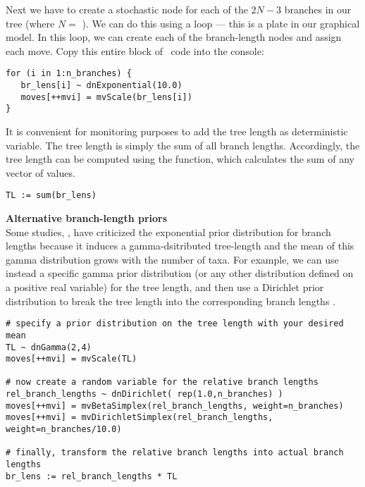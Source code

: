 Next we have to create a stochastic node for each of the $2N-3$ branches in our tree (where $N=$ ). 
We can do this using a  loop --- this is a plate in our graphical model. In this loop, we can create each of the branch-length nodes and assign each move. 
Copy this entire block of \Rev~code into the console:
{\tt \small \begin{snugshade*}
\begin{lstlisting}
for (i in 1:n_branches) {
   br_lens[i] ~ dnExponential(10.0)
   moves[++mvi] = mvScale(br_lens[i]) 
}
\end{lstlisting}
\end{snugshade*}}

It is convenient for monitoring purposes to add the tree length as deterministic variable. 
The tree length is simply the sum of all branch lengths. 
Accordingly, the tree length can be computed using the  function, which calculates the sum of any vector of values.
{\tt \begin{snugshade*}
\begin{lstlisting}
TL := sum(br_lens)
\end{lstlisting}
\end{snugshade*}}

\begin{framed}
\textbf{Alternative branch-length priors}\\
Some studies, \EG \cite{Brown2010,Rannala2012}, have criticized the exponential prior distribution for branch lengths because it induces a gamma-dsitributed tree-length and the mean of this gamma distribution grows with the number of taxa.
For example, we can use instead a specific gamma prior distribution (or any other distribution defined on a positive real variable) for the tree length, and then use a Dirichlet prior distribution to break the tree length into the corresponding branch lengths \citep{Zhang2012}.
{\tt \begin{snugshade*}
\begin{lstlisting}
# specify a prior distribution on the tree length with your desired mean
TL ~ dnGamma(2,4)
moves[++mvi] = mvScale(TL) 

# now create a random variable for the relative branch lengths
rel_branch_lengths ~ dnDirichlet( rep(1.0,n_branches) )
moves[++mvi] = mvBetaSimplex(rel_branch_lengths, weight=n_branches)
moves[++mvi] = mvDirichletSimplex(rel_branch_lengths, weight=n_branches/10.0)

# finally, transform the relative branch lengths into actual branch lengths
br_lens := rel_branch_lengths * TL
\end{lstlisting}
\end{snugshade*}}
\end{framed}


